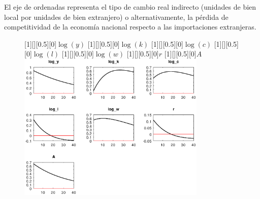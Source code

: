 \documentclass{nuevotema}
\begin{document}
El eje de ordenadas representa el tipo de cambio real indirecto (unidades de bien local por unidades de bien extranjero) o alternativamente, la pérdida de competitividad de la economía nacional respecto a las importaciones extranjeras.


\pagebreak

\begin{figure}[!htbp]
	[][0.5][0]{${\log(y)}$}
	[][0.5][0]{${\log(k)}$}
	[][0.5][0]{${\log(c)}$}
	[][0.5][0]{${\log(l)}$}
	[][0.5][0]{${\log(w)}$}
	[][0.5][0]{${r}$}
	[][0.5][0]{${A}$}
	\centering 
	\includegraphics[width=0.80\textwidth]{RBCp_IRF_eps_A}

	\label{fig:rbcefectodynareptfpermanente}
\end{figure}
\renewcommand{\rgcaptioneq}{}
\begin{center}
\rgcaptioneq
\end{center}
\end{document}
